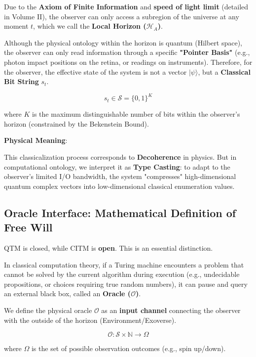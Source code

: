 Due to the \textbf{Axiom of Finite Information} and \textbf{speed of light limit} (detailed in Volume II), the observer can only access a subregion of the universe at any moment $t$, which we call the \textbf{Local Horizon ($\mathcal{H}_A$)}.

\begin{definition}
Although the physical ontology within the horizon is quantum (Hilbert space), the observer can only read information through a specific \textbf{"Pointer Basis"} (e.g., photon impact positions on the retina, or readings on instruments). Therefore, for the observer, the effective state of the system is not a vector $|\psi\rangle$, but a \textbf{Classical Bit String} $s_t$.

\begin{equation}
s_t \in \mathcal{S} = \{0, 1\}^K
\end{equation}

where $K$ is the maximum distinguishable number of bits within the observer's horizon (constrained by the Bekenstein Bound).
\end{definition}

\textbf{Physical Meaning}:

This classicalization process corresponds to \textbf{Decoherence} in physics. But in computational ontology, we interpret it as \textbf{Type Casting}: to adapt to the observer's limited I/O bandwidth, the system "compresses" high-dimensional quantum complex vectors into low-dimensional classical enumeration values.

\subsection{Oracle Interface: Mathematical Definition of Free Will}

QTM is closed, while CITM is \textbf{open}. This is an essential distinction.

In classical computation theory, if a Turing machine encounters a problem that cannot be solved by the current algorithm during execution (e.g., undecidable propositions, or choices requiring true random numbers), it can pause and query an external black box, called an \textbf{Oracle ($\mathcal{O}$)}.

\begin{definition}
We define the physical oracle $\mathcal{O}$ as an \textbf{input channel} connecting the observer with the outside of the horizon (Environment/Exoverse).

\begin{equation}
\mathcal{O}: \mathcal{S} \times \mathbb{N} \to \Omega
\end{equation}

where $\Omega$ is the set of possible observation outcomes (e.g., spin up/down).
\end{definition}

